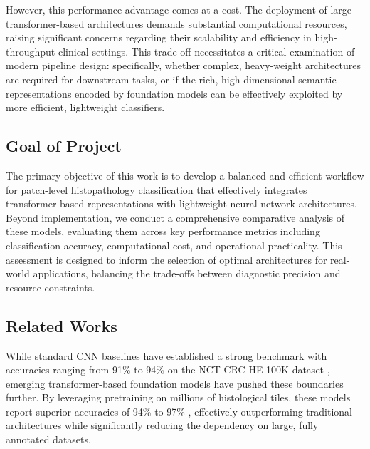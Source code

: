 \documentclass[a4paper,12pt]{article}
\begin{document}
However, this performance advantage comes at a cost. The deployment of large transformer-based architectures demands substantial computational resources, raising significant concerns regarding their scalability and efficiency in high-throughput clinical settings. This trade-off necessitates a critical examination of modern pipeline design: specifically, whether complex, heavy-weight architectures are required for downstream tasks, or if the rich, high-dimensional semantic representations encoded by foundation models can be effectively exploited by more efficient, lightweight classifiers.

\subsection{Goal of Project}
The primary objective of this work is to develop a balanced and efficient workflow for patch-level histopathology classification that effectively integrates transformer-based representations with lightweight neural network architectures. Beyond implementation, we conduct a comprehensive comparative analysis of these models, evaluating them across key performance metrics including classification accuracy, computational cost, and operational practicality. This assessment is designed to inform the selection of optimal architectures for real-world applications, balancing the trade-offs between diagnostic precision and resource constraints.

\subsection{Related Works}
While standard CNN baselines have established a strong benchmark with accuracies ranging from 91\% to 94\% on the NCT-CRC-HE-100K dataset \cite{kather_predicting_2019}, emerging transformer-based foundation models have pushed these boundaries further. By leveraging pretraining on millions of histological tiles, these models report superior accuracies of 94\% to 97\% \cite{pan_histomil_2023}, effectively outperforming traditional architectures while significantly reducing the dependency on large, fully annotated datasets.
\end{document}
